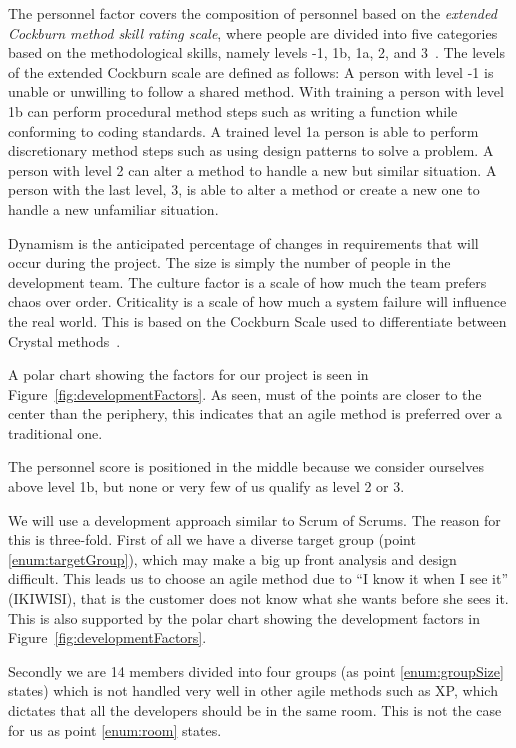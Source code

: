 The personnel factor covers the composition of personnel based on the \textit{extended Cockburn method skill rating scale}, where people are divided into five categories based on the methodological skills, namely levels -1, 1b, 1a, 2, and 3~\cite[p.~34]{boehmTurner}.
The levels of the extended Cockburn scale are defined as follows:
A person with level -1 is unable or unwilling to follow a shared method.
With training a person with level 1b can perform procedural method steps such as writing a function while conforming to coding standards.
A trained level 1a person is able to perform discretionary method steps such as using design patterns to solve a problem.
A person with level 2 can alter a method to handle a new but similar situation.
A person with the last level, 3, is able to alter a method or create a new one to handle a new unfamiliar situation.

Dynamism is the anticipated percentage of changes in requirements that will occur during the project.
The size is simply the number of people in the development team.
The culture factor is a scale of how much the team prefers chaos over order.
Criticality is a scale of how much a system failure will influence the real world.
This is based on the Cockburn Scale used to differentiate between Crystal methods~\cite{Larman04}.

A polar chart showing the factors for our project is seen in Figure~\ref{fig:developmentFactors}.
As seen, must of the points are closer to the center than the periphery, this indicates that an agile method is preferred over a traditional one.

The personnel score is positioned in the middle because we consider ourselves above level 1b, but none or very few of us qualify as level 2 or 3.


We will use a development approach similar to Scrum of Scrums.
The reason for this is three-fold.
First of all we have a diverse target group (point \ref{enum:targetGroup}), which may make a big up front analysis and design difficult.
This leads us to choose an agile method due to ``I know it when I see it'' (IKIWISI), that is the customer does not know what she wants before she sees it.
This is also supported by the polar chart showing the development factors in Figure~\ref{fig:developmentFactors}.

Secondly we are 14 members divided into four groups (as point \ref{enum:groupSize} states) which is not handled very well in other agile methods such as XP, which dictates that all the developers should be in the same room. 
This is not the case for us as point \ref{enum:room} states.

